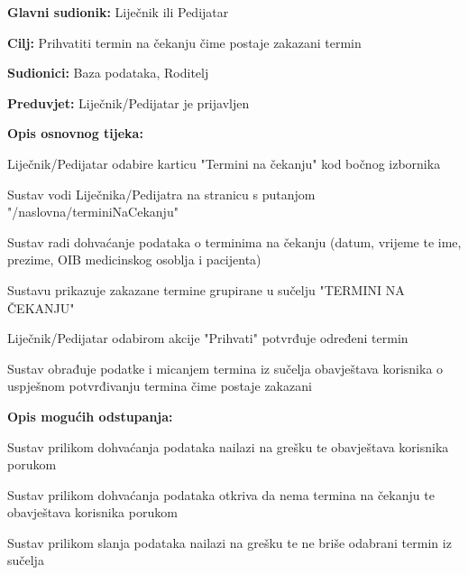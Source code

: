 					
					
				\noindent {}
					\begin{packed_item}
						
						\item \textbf{Glavni sudionik: }Liječnik ili Pedijatar
						\item  \textbf{Cilj:} Prihvatiti termin na čekanju čime postaje zakazani termin
						\item  \textbf{Sudionici:} Baza podataka, Roditelj
						\item  \textbf{Preduvjet:} Liječnik/Pedijatar je prijavljen
						\item  \textbf{Opis osnovnog tijeka:}
						
						\item[] \begin{packed_enum}
							\item Liječnik/Pedijatar odabire karticu "Termini na čekanju" kod bočnog izbornika
							\item Sustav vodi Liječnika/Pedijatra na stranicu s putanjom "/naslovna/terminiNaCekanju"
							\item Sustav radi dohvaćanje podataka o terminima na čekanju (datum, vrijeme te ime, prezime, OIB medicinskog osoblja i pacijenta)
							\item Sustavu prikazuje zakazane termine grupirane u sučelju "TERMINI NA ČEKANJU"
							\item Liječnik/Pedijatar odabirom akcije "Prihvati" potvrđuje određeni termin
							\item Sustav obrađuje podatke i micanjem termina iz sučelja obavještava korisnika o uspješnom potvrđivanju termina čime postaje zakazani
						\end{packed_enum}
						
						\item  \textbf{Opis mogućih odstupanja:}
						
						\item[] \begin{packed_item}
							\item[3.a] Sustav prilikom dohvaćanja podataka nailazi na grešku te obavještava korisnika porukom
						
							\item[3.b] Sustav prilikom dohvaćanja podataka otkriva da nema termina na čekanju te obavještava korisnika porukom
							
							\item[6.a] Sustav prilikom slanja podataka nailazi na grešku te ne briše odabrani termin iz sučelja
						\end{packed_item}
					\end{packed_item}	
					
